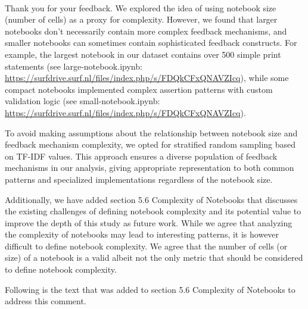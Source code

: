 \documentclass[11pt,fleqn]{article}
\newcommand{\eline}{\vspace*{.75\baselineskip}}
\newcommand{\Us}{\eline \noindent {\bf Response:}\\}
\begin{document}
\Us Thank you for your feedback. We explored the idea of using notebook size (number of cells) as a proxy for complexity. However, we found that larger notebooks don't necessarily contain more complex feedback mechanisms, and smaller notebooks can sometimes contain sophisticated feedback constructs. For example, the largest notebook in our dataset contains over 500 simple print statements (see large-notebook.ipynb: \url{https://surfdrive.surf.nl/files/index.php/s/FDQkCFxQNAVZIcq}), while some compact notebooks implemented complex assertion patterns with custom validation logic (see small-notebook.ipynb: \url{https://surfdrive.surf.nl/files/index.php/s/FDQkCFxQNAVZIcq}).

To avoid making assumptions about the relationship between notebook size and feedback mechanism complexity, we opted for stratified random sampling based on TF-IDF values. This approach ensures a diverse population of feedback mechanisms in our analysis, giving appropriate representation to both common patterns and specialized implementations regardless of the notebook size.

Additionally, we have added section 5.6 Complexity of Notebooks that discusses the existing challenges of defining notebook complexity and its potential value to improve the depth of this study as future work. While we agree that analyzing the complexity of notebooks may lead to interesting patterns, it is however difficult to define notebook complexity. We agree that the number of cells (or size) of a notebook is a valid albeit not the only metric that should be considered to define notebook complexity.

Following is the text that was added to section 5.6 Complexity of Notebooks to address this comment.
\end{document}
